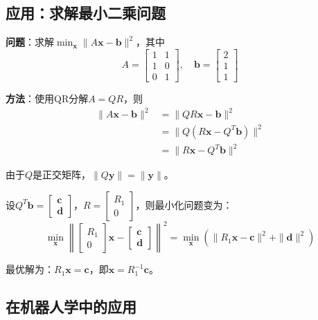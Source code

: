 \documentclass[12pt,a4paper]{article}
\begin{document}
\subsection{应用：求解最小二乘问题}

\textbf{问题}：求解$\min_{\bm{x}} \|A\bm{x} - \bm{b}\|^2$，其中
\begin{equation}
A = \begin{bmatrix} 1 & 1 \\ 1 & 0 \\ 0 & 1 \end{bmatrix}, \quad
\bm{b} = \begin{bmatrix} 2 \\ 1 \\ 1 \end{bmatrix}
\end{equation}

\textbf{方法}：使用QR分解$A = QR$，则
\begin{align}
\|A\bm{x} - \bm{b}\|^2 &= \|QR\bm{x} - \bm{b}\|^2 \\
&= \|Q(R\bm{x} - Q^T\bm{b})\|^2 \\
&= \|R\bm{x} - Q^T\bm{b}\|^2
\end{align}

由于$Q$是正交矩阵，$\|Q\bm{y}\| = \|\bm{y}\|$。

设$Q^T\bm{b} = \begin{bmatrix} \bm{c} \\ \bm{d} \end{bmatrix}$，$R = \begin{bmatrix} R_1 \\ 0 \end{bmatrix}$，则最小化问题变为：
\begin{equation}
\min_{\bm{x}} \left\| \begin{bmatrix} R_1 \\ 0 \end{bmatrix} \bm{x} - \begin{bmatrix} \bm{c} \\ \bm{d} \end{bmatrix} \right\|^2 = \min_{\bm{x}} (\|R_1\bm{x} - \bm{c}\|^2 + \|\bm{d}\|^2)
\end{equation}

最优解为：$R_1\bm{x} = \bm{c}$，即$\bm{x} = R_1^{-1}\bm{c}$。

\subsection{在机器人学中的应用}
\end{document}
